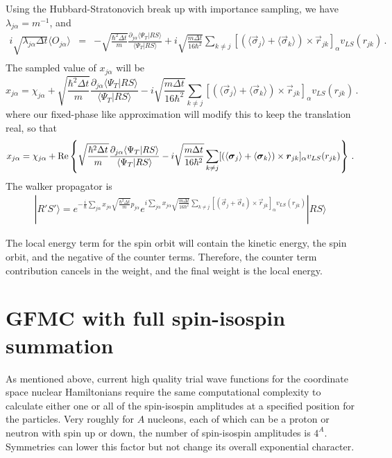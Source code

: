 Using the Hubbard-Stratonovich break up with importance sampling, we have
 $\lambda_{j\alpha} = m^{-1}$, and
 \begin{eqnarray}
 i\sqrt{\lambda_{j\alpha}\Delta t}\langle O_{j\alpha} \rangle
 &=& -\sqrt{\frac{\hbar^2 \Delta t}{m}}
 \frac{\partial_{j\alpha} \langle \Psi_T |RS\rangle}
 {\langle \Psi_T |RS\rangle} +i \sqrt{\frac{m \Delta t}{16 \hbar^2}}
 \sum_{k\neq j}[(\langle \vec \sigma_j\rangle+\langle \vec \sigma_k\rangle)\times
 \vec r_{jk} ]_{\alpha} v_{LS}(r_{jk})\,.
 \nonumber\\
 \end{eqnarray}
 The sampled value of $x_{j\alpha}$ will be
 \begin{equation}
 x_{j\alpha} = \chi_{j\alpha} + 
 \sqrt{\frac{\hbar^2 \Delta t}{m}}
 \frac{\partial_{j\alpha} \langle \Psi_T |RS\rangle}
 {\langle \Psi_T |RS\rangle}
 -i \sqrt{\frac{m \Delta t}{16 \hbar^2}}
 \sum_{k\neq j}[(\langle \vec \sigma_j\rangle+\langle \vec \sigma_k\rangle)\times
 \vec r_{jk} ]_{\alpha} v_{LS}(r_{jk})\,.
 \end{equation}
 where our fixed-phase like approximation
 will modify this to keep the translation real, so that
 \begin{equation}
 x_{j\alpha} = \chi_{j\alpha} +  {\rm Re}\left \{
 \sqrt{\frac{\hbar^2 \Delta t}{m}}
 \frac{\partial_{j\alpha} \langle \Psi_T |RS\rangle}
 {\langle \Psi_T |RS\rangle}
 -i \sqrt{\frac{m \Delta t}{16 \hbar^2}}
 \sum_{k\neq j}[(\langle \vec \sigma_j\rangle+\langle \vec \sigma_k\rangle)\times
 \vec r_{jk} ]_{\alpha} v_{LS}(r_{jk}) \right \}\,.
 \end{equation}
 The walker propagator is
 \begin{eqnarray}
 |R'S'\rangle = e^{-\frac{i}{\hbar} \sum_{j\alpha} x_{j\alpha}
 	\sqrt{\frac{\hbar^2\Delta t}{m}} p_{j\alpha} }
 e^{i \sum_{j\alpha} x_{j\alpha} \sqrt{\frac{m \Delta t }{16\hbar^2}}
 	\sum_{k\neq j}[(\vec \sigma_j+ \vec \sigma_k)\times
 	\vec r_{jk} ]_{\alpha} v_{LS}(r_{jk}) }  |R S\rangle
 \end{eqnarray}
 
 The local energy term for the spin orbit will contain the kinetic energy,
 the spin orbit, and the negative of the counter terms. Therefore, the
 counter term contribution cancels in the weight, and the final weight is
 the local energy. 
 
 \section{GFMC with full spin-isospin summation}
 As mentioned above, current 
 high quality trial wave functions for the coordinate space
 nuclear Hamiltonians require the same computational complexity to
 calculate either one or all of the spin-isospin amplitudes at a specified
 position for the particles. Very roughly for $A$ nucleons, each of which
 can be a proton or neutron with spin up or down, the number of
 spin-isospin amplitudes is $4^A$. Symmetries can lower
 this factor but not change its overall exponential character.
 
